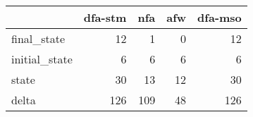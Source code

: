 \begin{tabular}{lrrrr}
\toprule
{} &  dfa-stm &  nfa &  afw &  dfa-mso \\
\midrule
final\_state   &       12 &    1 &    0 &       12 \\
initial\_state &        6 &    6 &    6 &        6 \\
state         &       30 &   13 &   12 &       30 \\
delta         &      126 &  109 &   48 &      126 \\
\bottomrule
\end{tabular}
